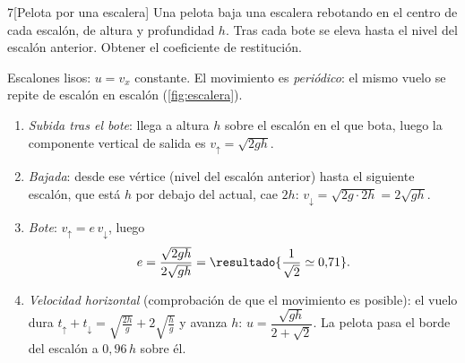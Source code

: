 \begin{problema}{7}[Pelota por una escalera]
\label{prob:7}
Una pelota baja una escalera rebotando en el centro de cada escalón, de altura y
profundidad $h$. Tras cada bote se eleva hasta el nivel del escalón anterior. Obtener el
coeficiente de restitución.
\end{problema}

\begin{resolucion}
Escalones lisos: $u=v_{x}$ constante. El movimiento es \emph{periódico}: el mismo
vuelo se repite de escalón en escalón (\cref{fig:escalera}).
\begin{enumerate}
  \item \emph{Subida tras el bote}: llega a altura $h$ sobre el escalón en el que bota, luego
        la componente vertical de salida es $v_{\uparrow}=\sqrt{2gh}$.
  \item \emph{Bajada}: desde ese vértice (nivel del escalón anterior) hasta el siguiente escalón,
        que está $h$ por debajo del actual, cae $2h$: $v_{\downarrow}=\sqrt{2g\cdot2h}=2\sqrt{gh}$.
  \item \emph{Bote}: $v_{\uparrow}=e\,v_{\downarrow}$, luego
        \[
          e=\frac{\sqrt{2gh}}{2\sqrt{gh}}=\resultado{\frac1{\sqrt2}\simeq0{,}71} .
        \]
  \item \emph{Velocidad horizontal} (comprobación de que el movimiento es posible): el vuelo dura
        $t_{\uparrow}+t_{\downarrow}=\sqrt{\tfrac{2h}g}+2\sqrt{\tfrac hg}$ y avanza $h$:
        $u=\dfrac{\sqrt{gh}}{2+\sqrt2}$. La pelota pasa el borde del escalón a $0{,}96\,h$ sobre él.\qedhere
\end{enumerate}
\end{resolucion}

